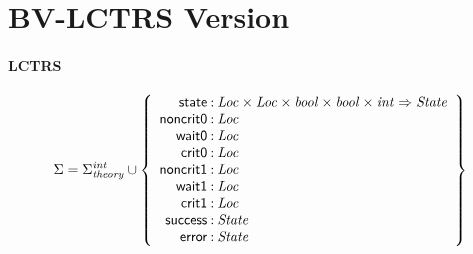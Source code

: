 \documentclass[a4paper]{article}
\newcommand{\Sort}[1]{\mathit{#1}}
\newcommand{\symb}[1]{\mathsf{#1}}
\newcommand{\Sigmainttheory}{\Sigma^{\mathit{int}}_{\mathit{theory}}}
\begin{document}
\newpage
\section*{BV-LCTRS Version}


\paragraph{LCTRS}

\[
\Sigma = 
\Sigmainttheory \cup\left\{
\begin{array}{r@{\>}c@{\>}l}
\symb{state} & : & \Sort{Loc} \times \Sort{Loc} \times \Sort{bool} \times \Sort{bool} \times \Sort{int} \Rightarrow \Sort{State}\\
\symb{noncrit0} & : & \Sort{Loc}\\
\symb{wait0} & : & \Sort{Loc}\\
\symb{crit0} & : & \Sort{Loc}\\
\symb{noncrit1} & : & \Sort{Loc}\\
\symb{wait1} & : & \Sort{Loc}\\
\symb{crit1} & : & \Sort{Loc}\\
\symb{success} & : & \Sort{State}\\
\symb{error} & : & \Sort{State}\\
\end{array}
\right\}
\]
\end{document}
